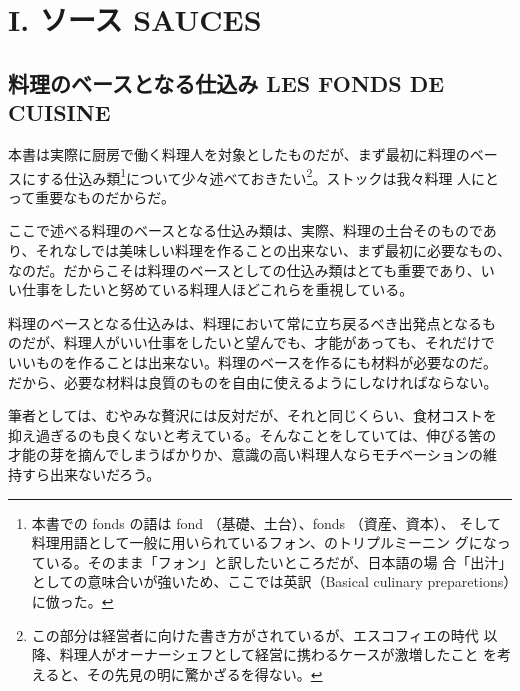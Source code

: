 \documentclass[twoside,12Q,b5paper]{escoffierltjsbook}
\date{}
\newenvironment{recette}{\begin{small}\begin{spacing}{1}\begin{multicols}{2}}{\end{multicols}\end{spacing}\end{small}}
\begin{document}





\chapter*{I. ソース SAUCES}\label{i.-ux30bdux30fcux30b9-sauces}

\section*{料理のベースとなる仕込み LES FONDS DE
CUISINE}\label{ux6599ux7406ux306eux30d9ux30fcux30b9ux3068ux306aux308bux4ed5ux8fbcux307f-les-fonds-de-cuisine}

本書は実際に厨房で働く料理人を対象としたものだが、まず最初に料理のベー
スにする仕込み類\footnote{本書での fonds の語は fond
  （基礎、土台）、fonds （資産、資本）、
  そして料理用語として一般に用いられているフォン、のトリプルミーニン
  グになっている。そのまま「フォン」と訳したいところだが、日本語の場
  合「出汁」としての意味合いが強いため、ここでは英訳（Basical culinary
  preparetions）に倣った。}について少々述べておきたい\footnote{この部分は経営者に向けた書き方がされているが、エスコフィエの時代
  以降、料理人がオーナーシェフとして経営に携わるケースが激増したこと
  を考えると、その先見の明に驚かざるを得ない。}。ストックは我々料理
人にとって重要なものだからだ。

ここで述べる料理のベースとなる仕込み類は、実際、料理の土台そのものであ
り、それなしでは美味しい料理を作ることの出来ない、まず最初に必要なもの、
なのだ。だからこそは料理のベースとしての仕込み類はとても重要であり、い
い仕事をしたいと努めている料理人ほどこれらを重視している。

料理のベースとなる仕込みは、料理において常に立ち戻るべき出発点となるも
のだが、料理人がいい仕事をしたいと望んでも、才能があっても、それだけで
いいものを作ることは出来ない。料理のベースを作るにも材料が必要なのだ。
だから、必要な材料は良質のものを自由に使えるようにしなければならない。

筆者としては、むやみな贅沢には反対だが、それと同じくらい、食材コストを
抑え過ぎるのも良くないと考えている。そんなことをしていては、伸びる筈の
才能の芽を摘んでしまうばかりか、意識の高い料理人ならモチベーションの維
持すら出来ないだろう。
\end{document}
